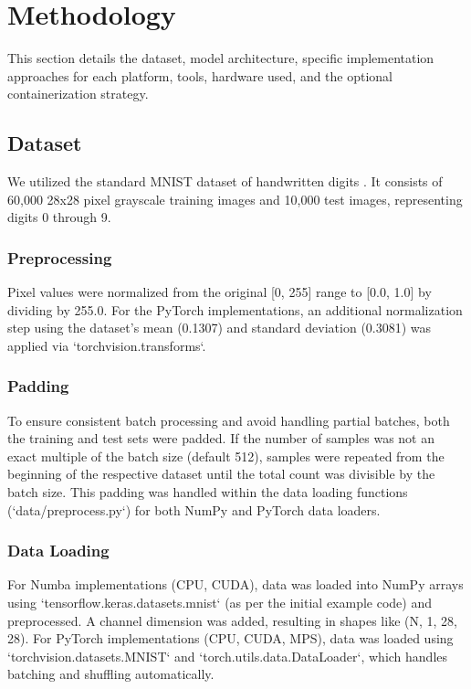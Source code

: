 \documentclass[conference]{IEEEtran} %
\begin{document}
\section{Methodology}
\label{sec:methodology}
This section details the dataset, model architecture, specific implementation approaches for each platform, tools, hardware used, and the optional containerization strategy.

\subsection{Dataset}
We utilized the standard MNIST dataset of handwritten digits \cite{LeCun1998}. It consists of 60,000 28x28 pixel grayscale training images and 10,000 test images, representing digits 0 through 9.
\subsubsection{Preprocessing} Pixel values were normalized from the original [0, 255] range to [0.0, 1.0] by dividing by 255.0. For the PyTorch implementations, an additional normalization step using the dataset's mean (0.1307) and standard deviation (0.3081) was applied via `torchvision.transforms`.
\subsubsection{Padding} To ensure consistent batch processing and avoid handling partial batches, both the training and test sets were padded. If the number of samples was not an exact multiple of the batch size (default 512), samples were repeated from the beginning of the respective dataset until the total count was divisible by the batch size. This padding was handled within the data loading functions (`data/preprocess.py`) for both NumPy and PyTorch data loaders.
\subsubsection{Data Loading} For Numba implementations (CPU, CUDA), data was loaded into NumPy arrays using `tensorflow.keras.datasets.mnist` (as per the initial example code) and preprocessed. A channel dimension was added, resulting in shapes like (N, 1, 28, 28). For PyTorch implementations (CPU, CUDA, MPS), data was loaded using `torchvision.datasets.MNIST` and `torch.utils.data.DataLoader`, which handles batching and shuffling automatically.
\end{document}
